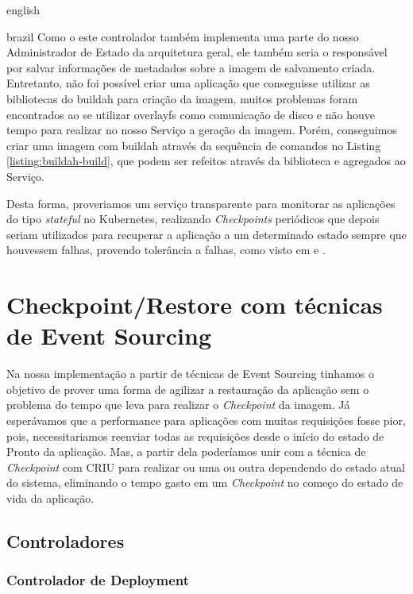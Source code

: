 \begin{otherlanguage*}{english}
\begin{otherlanguage*}{brazil}
Como o este controlador também implementa uma parte do nosso Administrador de Estado da 
arquitetura geral, ele também seria o responsável por salvar informações de metadados
sobre a imagem de salvamento criada. Entretanto, não foi possível criar uma aplicação
que conseguisse utilizar as bibliotecas do buildah para criação da imagem, muitos
problemas foram encontrados ao se utilizar overlayfs como comunicação de disco e não
houve tempo para realizar no nosso Serviço a geração da imagem. Porém, conseguimos criar
uma imagem com buildah através da sequência de comandos no Listing
\ref{listing:buildah-build}, que podem ser refeitos através da biblioteca e agregados ao
Serviço.


Desta forma, proveriamos um serviço transparente para monitorar as aplicações do tipo
\textit{stateful} no Kubernetes, realizando \textit{Checkpoints} periódicos que depois
seriam utilizados para recuperar a aplicação a um determinado estado sempre que houvessem
falhas, provendo tolerância a falhas, como visto em \cite{vayghan2021kubernetes}
\cite{muller2022architecture} \cite{oh2018stateful} e \cite{schmidttransparent}.

\section{Checkpoint/Restore com técnicas de Event Sourcing}

Na nossa implementação a partir de técnicas de Event Sourcing tinhamos o objetivo de
prover uma forma de agilizar a restauração da aplicação sem o problema do tempo que leva
para realizar o \textit{Checkpoint} da imagem. Já esperávamos que a performance para
aplicações com muitas requisições fosse pior, pois, necessitariamos reenviar todas as
requisições desde o início do estado de Pronto da aplicação. Mas, a partir dela
poderíamos unir com a técnica de \textit{Checkpoint} com CRIU para realizar ou uma ou
outra dependendo do estado atual do sistema, eliminando o tempo gasto em um
\textit{Checkpoint} no começo do estado de vida da aplicação.

\subsection{Controladores}

\subsubsection{Controlador de Deployment}


\end{otherlanguage*}
\end{otherlanguage*}
